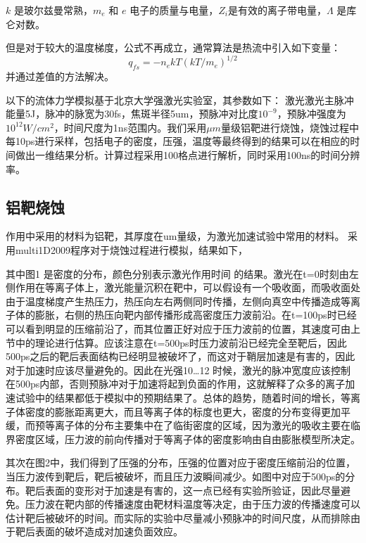 $k$ 是玻尔兹曼常熟，$m_e$ 和 $e$ 电子的质量与电量，$Z_i$是有效的离子带电量，$\Lambda$
是库仑对数。

但是对于较大的温度梯度，公式不再成立，通常算法是热流中引入如下变量：
\begin{equation}
\label{eqn:freeStream}
q_{fs}=-n_e k T (k T / m_e)^{1/2}
\end{equation} 
并通过差值的方法解决。








以下的流体力学模拟基于北京大学强激光实验室，其参数如下：
激光激光主脉冲能量5J，脉冲的脉宽为30fs，焦斑半径5um，预脉冲对比度$10^{-9}$，预脉冲强度为$10^12W/cm^2$，时间尺度为1ns范围内。我们采用$\mu m$量级铝靶进行烧蚀，烧蚀过程中每10ps进行采样，包括电子的密度，压强，温度等最终得到的结果可以在相应的时间做出一维结果分析。计算过程采用100格点进行解析，同时采用100ns的时间分辨率。

\subsection{铝靶烧蚀}

作用中采用的材料为铝靶，其厚度在um量级，为激光加速试验中常用的材料。 采用multi1D2009程序对于烧蚀过程进行模拟，结果如下， 


其中图1 是密度的分布，颜色分别表示激光作用时间 的结果。激光在t=0时刻由左侧作用在等离子体上，激光能量沉积在靶中，可以假设有一个吸收面，而吸收面处由于温度梯度产生热压力，热压向左右两侧同时传播，左侧向真空中传播造成等离子体的膨胀，右侧的热压向靶内部传播形成高密度压力波前沿。在t=100ps时已经可以看到明显的压缩前沿了，而其位置正好对应于压力波前的位置，其速度可由上节中的理论进行估算。应该注意在t=500ps时压力波前沿已经完全至靶后，因此500ps之后的靶后表面结构已经明显被破坏了，而这对于鞘层加速是有害的，因此对于加速时应该尽量避免的。因此在光强10…12 时候，激光的脉冲宽度应该控制在500ps内部，否则预脉冲对于加速将起到负面的作用，这就解释了众多的离子加速试验中的结果都低于模拟中的预期结果了。总体的趋势，随着时间的增长，等离子体密度的膨胀距离更大，而且等离子体的标度也更大，密度的分布变得更加平缓，而预等离子体的分布主要集中在了临街密度的区域，因为激光的吸收主要在临界密度区域，压力波的前向传播对于等离子体的密度影响由自由膨胀模型所决定。




其次在图2中，我们得到了压强的分布，压强的位置对应于密度压缩前沿的位置，当压力波传到靶后，靶后被破坏，而且压力波瞬间减少。如图中对应于500ps的分布。靶后表面的变形对于加速是有害的，这一点已经有实验所验证，因此尽量避免。压力波在靶内部的传播速度由靶材料温度等决定，由于压力波的传播速度可以估计靶后被破坏的时间。而实际的实验中尽量减小预脉冲的时间尺度，从而排除由于靶后表面的破坏造成对加速负面效应。


